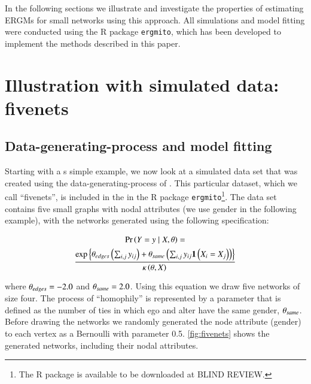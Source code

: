 \documentclass[review, nonatbib,doubleblind]{elsarticle/elsarticle}
\begin{document}

In the following sections we illustrate and investigate the properties of estimating ERGMs for small networks using this approach. All simulations and model fitting were conducted using the R package \texttt{ergmito}, which has been developed to implement the methods described in this paper.

\section{Illustration with simulated data: fivenets}

\subsection{Data-generating-process and model fitting}

Starting with a s simple example, we now look at a simulated data set that was created using the data-generating-process of \ergmitos{}. This particular dataset, which we call ``fivenets'', is included in the in the R package \texttt{ergmito}\footnote{The R package is available to be downloaded at  BLIND REVIEW.}. %
The data set contains five small graphs with nodal attributes (we use gender in the following example), with the networks generated using the following specification:

\begin{multline*}
\Prcond{\Adjmat = \adjmat}{\Indepvar, \params} = \\
\frac{ %
    \exp{\params_{edges}\left(\sum_{i,j} \adjmat_{ij}\right) + %
    \params_{same}\left(\sum_{i,j} \adjmat_{ij}\isone{\Indepvar_{i} = \Indepvar_{j}}\right)} %
    }{%
    \normconst{}
    }
\end{multline*}

\noindent where $\theta_{edges} = -2.0$ and $\theta_{same} = 2.0$. Using this equation we draw five networks of size four. The process of ``homophily'' is represented by a parameter that is defined as the number of ties in which ego and alter have the same gender, $\theta_{same}$. Before drawing the networks we randomly generated the node attribute (gender) to each vertex as a Bernoulli with parameter 0.5. \autoref{fig:fivenets} shows the generated networks, including their nodal attributes.
\end{document}
